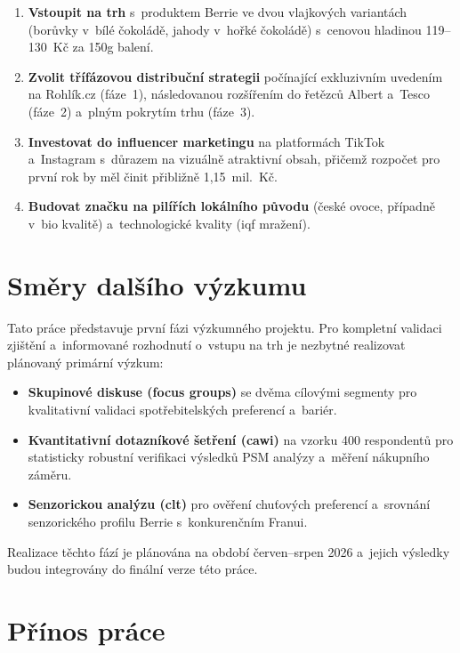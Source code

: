 \begin{enumerate}
  \item \textbf{Vstoupit na trh} s~produktem Berrie ve dvou vlajkových variantách (borůvky v~bílé čokoládě, jahody v~hořké čokoládě) s~cenovou hladinou 119--130~Kč za 150g balení.
  \item \textbf{Zvolit třífázovou distribuční strategii} počínající exkluzivním uvedením na Rohlík.cz (fáze~1), následovanou rozšířením do řetězců Albert a~Tesco (fáze~2) a~plným pokrytím trhu (fáze~3).
  \item \textbf{Investovat do influencer marketingu} na platformách TikTok a~Instagram s~důrazem na vizuálně atraktivní obsah, přičemž rozpočet pro první rok by měl činit přibližně 1,15~mil.~Kč.
  \item \textbf{Budovat značku na pilířích lokálního původu} (české ovoce, případně v~\gls{bio} kvalitě) a~technologické kvality (\gls{iqf} mražení).
\end{enumerate}

\section{Směry dalšího výzkumu}

Tato práce představuje první fázi výzkumného projektu. Pro kompletní validaci zjištění a~informované rozhodnutí o~vstupu na trh je nezbytné realizovat plánovaný primární výzkum:

\begin{itemize}
  \item \textbf{Skupinové diskuse (focus groups)} se dvěma cílovými segmenty pro kvalitativní validaci spotřebitelských preferencí a~bariér.
  \item \textbf{Kvantitativní dotazníkové šetření (\gls{cawi})} na vzorku 400 respondentů pro statisticky robustní verifikaci výsledků PSM analýzy a~měření nákupního záměru.
  \item \textbf{Senzorickou analýzu (\gls{clt})} pro ověření chuťových preferencí a~srovnání senzorického profilu Berrie s~konkurenčním Franui.
\end{itemize}

Realizace těchto fází je plánována na období červen--srpen 2026 a~jejich výsledky budou integrovány do finální verze této práce.

\section{Přínos práce}

